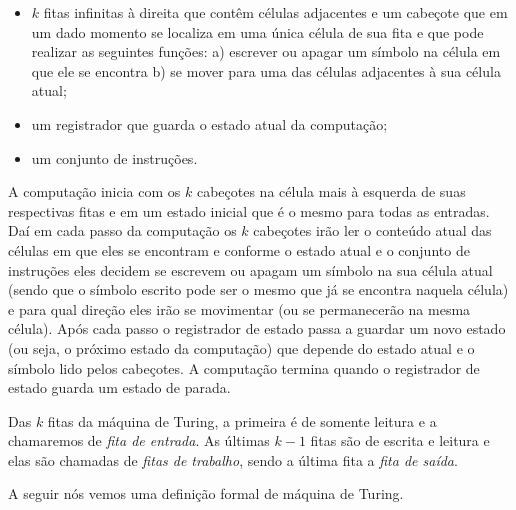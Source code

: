 \begin{itemize}

\item $k$ fitas infinitas à direita que contêm células adjacentes e um cabeçote que em um dado momento se localiza em uma única célula de sua fita e que pode realizar as seguintes funções: a) escrever ou apagar um símbolo na célula em que ele se encontra b) se mover para uma das células adjacentes à sua célula atual;

\item um registrador que guarda o estado atual da computação;

\item um conjunto de instruções.

\end{itemize}

A computação inicia com os $k$ cabeçotes na célula mais à esquerda de suas respectivas fitas e em um estado inicial que é o mesmo para todas as entradas. Daí em cada passo da computação os $k$ cabeçotes irão ler o conteúdo atual das células em que eles se encontram e conforme o estado atual e o conjunto de instruções eles decidem se escrevem ou apagam um símbolo na sua célula atual (sendo que o símbolo escrito pode ser o mesmo que já se encontra naquela célula) e para qual direção eles irão se movimentar (ou se permanecerão na mesma célula). Após cada passo o registrador de estado passa a guardar um novo estado (ou seja, o próximo estado da computação) que depende do estado atual e o símbolo lido pelos cabeçotes. A computação termina quando o registrador de estado guarda um estado de parada.

Das $k$ fitas da máquina de Turing, a primeira é de somente leitura e a chamaremos de \emph{fita de entrada}. As últimas $k - 1$ fitas são de escrita e leitura e elas são chamadas de \emph{fitas de trabalho}, sendo a última fita a \emph{fita de saída}.

A seguir nós vemos uma definição formal de máquina de Turing.

